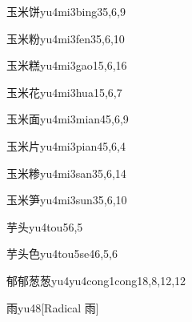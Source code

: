 \begin{entry}{玉米饼}{yu4mi3bing3}{5,6,9}
\end{entry}

\begin{entry}{玉米粉}{yu4mi3fen3}{5,6,10}
\end{entry}

\begin{entry}{玉米糕}{yu4mi3gao1}{5,6,16}
\end{entry}

\begin{entry}{玉米花}{yu4mi3hua1}{5,6,7}
\end{entry}

\begin{entry}{玉米面}{yu4mi3mian4}{5,6,9}
\end{entry}

\begin{entry}{玉米片}{yu4mi3pian4}{5,6,4}
\end{entry}

\begin{entry}{玉米糁}{yu4mi3san3}{5,6,14}
\end{entry}

\begin{entry}{玉米笋}{yu4mi3sun3}{5,6,10}
\end{entry}

\begin{entry}{芋头}{yu4tou5}{6,5}
\end{entry}

\begin{entry}{芋头色}{yu4tou5se4}{6,5,6}
\end{entry}

\begin{entry}{郁郁葱葱}{yu4yu4cong1cong1}{8,8,12,12}
\end{entry}

\begin{entry}{雨}{yu4}{8}[Radical 雨]
\end{entry}

